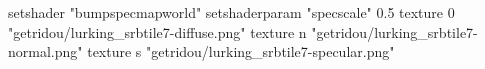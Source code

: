 setshader "bumpspecmapworld"
setshaderparam "specscale" 0.5
texture 0 "getridou/lurking_srbtile7-diffuse.png"
texture n "getridou/lurking_srbtile7-normal.png"
texture s "getridou/lurking_srbtile7-specular.png"